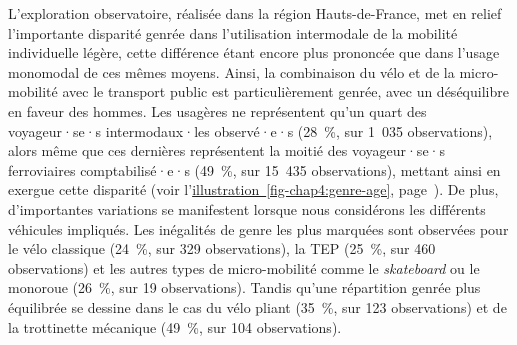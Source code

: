 \begin{refsegment}
L'exploration observatoire, réalisée dans la région Hauts-de-France, met en relief l'importante disparité genrée dans l'utilisation intermodale de la mobilité individuelle légère, cette différence étant encore plus prononcée que dans l'usage monomodal de ces mêmes moyens. Ainsi, la combinaison du vélo et de la micro-mobilité avec le transport public est particulièrement genrée, avec un déséquilibre en faveur des hommes. Les usagères ne représentent qu'un quart des voyageur·se·s intermodaux·les observé·e·s (28~\%, sur 1~035 observations), alors même que ces dernières représentent la moitié des voyageur·se·s ferroviaires comptabilisé·e·s (49~\%, sur 15~435 observations), mettant ainsi en exergue cette disparité (voir l'\hyperref[fig-chap4:genre-age]{illustration~\ref{fig-chap4:genre-age}}, page~\pageref{fig-chap4:genre-age}). De plus, d'importantes variations se manifestent lorsque nous considérons les différents véhicules impliqués. Les inégalités de genre les plus marquées sont observées pour le vélo classique (24~\%, sur 329 observations), la \acrshort{TEP} (25~\%, sur 460 observations) et les autres types de micro-mobilité comme le \textsl{skateboard} ou le monoroue (26~\%, sur 19 observations). Tandis qu'une répartition genrée plus équilibrée se dessine dans le cas du vélo pliant (35~\%, sur 123 observations) et de la trottinette mécanique (49~\%, sur 104 observations).%


\end{refsegment}
